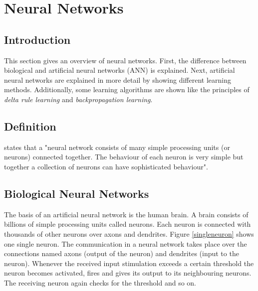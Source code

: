 \chapter{Neural Networks}

\section{Introduction}

This section gives an overview of neural networks. First, the difference between biological and artificial neural networks (\ac{ANN}) is explained. Next, artificial neural networks are explained in more detail by showing different learning methods. Additionally, some learning algorithms are shown like the principles of {\em delta rule learning} and {\em backpropagation learning}.

\section{Definition}

\cite[p. 156]{essence} states that a "neural network consists of many simple processing units (or neurons) connected together. The behaviour of each neuron is very simple but together a collection of neurons can have sophisticated behaviour".

\section{Biological Neural Networks}

The basis of an artificial neural network is the human brain. A brain consists of billions of simple processing units called neurons. Each neuron is connected with thousands of other neurons over axons and dendrites. Figure \ref{singleneuron} shows one single neuron. The communication in a neural network takes place over the connections named axons (output of the neuron) and dendrites (input to the neuron). Whenever the received input stimulation exceeds a certain threshold the neuron becomes activated, fires and gives its output to its neighbouring neurons. The receiving neuron again checks for the threshold and so on.

